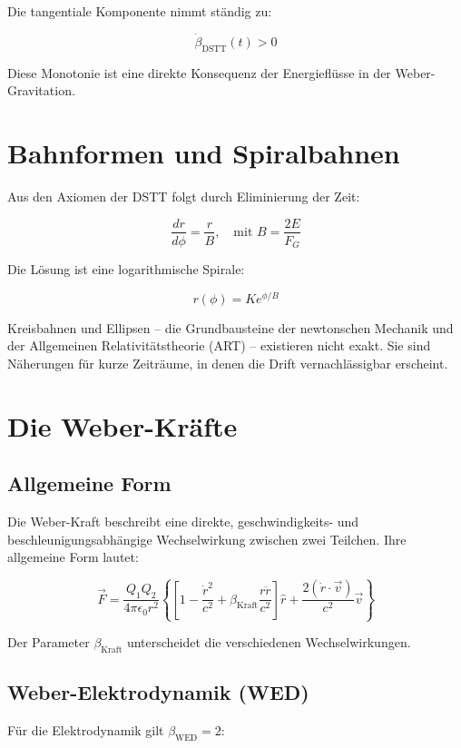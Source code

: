 Die tangentiale Komponente nimmt ständig zu:

\[
\dot{\beta}_{\text{DSTT}}(t) > 0
\]

Diese Monotonie ist eine direkte Konsequenz der Energieflüsse in der Weber-Gravitation.

\section{Bahnformen und Spiralbahnen}
\label{sec:dstt_bahnen}

Aus den Axiomen der DSTT folgt durch Eliminierung der Zeit:

\[
\frac{dr}{d\phi} = \frac{r}{B}, \quad \text{mit } B = \frac{2E}{F_G}
\]

Die Lösung ist eine logarithmische Spirale:

\[
r(\phi) = Ke^{\phi/B}
\]

Kreisbahnen und Ellipsen – die Grundbausteine der newtonschen Mechanik und der Allgemeinen Relativitätstheorie (ART) – existieren nicht exakt. Sie sind Näherungen für kurze Zeiträume, in denen die Drift vernachlässigbar erscheint.

\section{Die Weber-Kräfte}
\label{sec:weber_kraefte}

\subsection{Allgemeine Form}
\label{sec:weber_allgemein}

Die Weber-Kraft beschreibt eine direkte, geschwindigkeits- und beschleunigungsabhängige Wechselwirkung zwischen zwei Teilchen. Ihre allgemeine Form lautet:

\[
\vec{F} = \frac{Q_1 Q_2}{4\pi\epsilon_0 r^2} \left\{ \left[ 1 - \frac{\dot{r}^2}{c^2} + \beta_{\text{Kraft}} \frac{r\ddot{r}}{c^2} \right] \hat{r} + \frac{2(\dot{r} \cdot \vec{v})}{c^2} \vec{v} \right\}
\]

Der Parameter \(\beta_{\text{Kraft}}\) unterscheidet die verschiedenen Wechselwirkungen.

\subsection{Weber-Elektrodynamik (WED)}
\label{sec:weber_wed}

Für die Elektrodynamik gilt \(\beta_{\text{WED}} = 2\):

